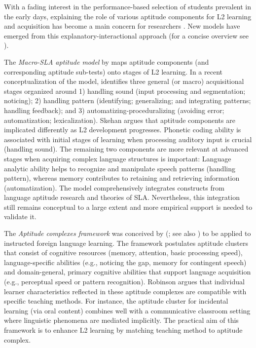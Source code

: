 \documentclass[output=paper]{langscibook}
\begin{document}
With a fading interest in the performance-based selection of students prevalent in the early days, explaining the role of various aptitude components for L2 learning and acquisition has become a main concern for researchers \citep{Li2019}. New models have emerged from this explanatory-interactional approach (for a concise overview see \citealt{WenEtAl2017}).\largerpage

The \textit{Macro-SLA aptitude model} by \citet{Skehan2002, Skehan2019} maps aptitude components (and corresponding aptitude sub-tests) onto stages of L2 learning. In a recent conceptualization of the model, \citet{Skehan2019} identifies three general (or macro) acquisitional stages organized around 1) handling sound (input processing and segmentation; noticing); 2) handling pattern (identifying; generalizing; and integrating patterns; handling feedback); and 3) automatizing-pro\-ce\-du\-ra\-liz\-ing (avoiding error; automatization; lexicalization). Skehan argues that aptitude components are implicated differently as L2 development progresses. Phonetic coding ability is associated with initial stages of learning when processing auditory input is crucial (handling sound). The remaining two components are more relevant at advanced stages when acquiring complex language structures is important: Language analytic ability helps to recognize and manipulate speech patterns (handling pattern), whereas memory contributes to retaining and retrieving information (automatization). The model comprehensively integrates constructs from language aptitude research and theories of SLA. Nevertheless, this integration still remains conceptual to a large extent and more empirical support is needed to validate it. 

The \textit{Aptitude complexes framework} was conceived by \citeauthor{Robinson2001} (\citeyear{Robinson2001}; see also \citealt{Robinson2002}) to be applied to instructed foreign language learning. The framework postulates aptitude clusters that consist of cognitive resources (memory, attention, basic processing speed), language-specific abilities (e.g., noticing the gap, memory for contingent speech) and do\-main-gen\-er\-al, primary cognitive abilities that support language acquisition (e.g., perceptual speed or pattern recognition). Robinson argues that individual learner characteristics reflected in these aptitude complexes are compatible with specific teaching methods. For instance, the aptitude cluster for incidental learning (via oral content) combines well with a communicative classroom setting where linguistic phenomena are mediated implicitly. The practical aim of this framework is to enhance L2 learning by matching teaching method to aptitude complex.
\end{document}
